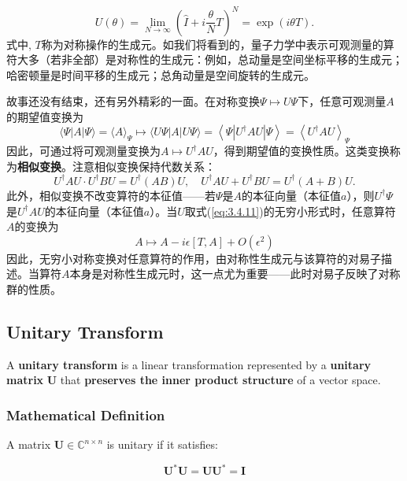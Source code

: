 \begin{equation}
	U(\theta)=\lim_{N\to\infty}\left(\hat I+i\frac{\theta }{N}T\right)^N=\exp(i\theta T).\label{eq:3.4.13} 
\end{equation}
式中, $T$称为对称操作的生成元。如我们将看到的，量子力学中表示可观测量的算符大多（若非全部）是对称性的生成元：例如，总动量是空间坐标平移的生成元；哈密顿量是时间平移的生成元；总角动量是空间旋转的生成元。 \par
故事还没有结束，还有另外精彩的一面。在对称变换$\Psi\mapsto U\Psi$下，任意可观测量$A$的期望值变换为
\begin{equation}
	\langle\Psi|A|\Psi\rangle=\langle A\rangle_{\Psi}\mapsto\langle U\Psi|A| U\Psi\rangle=\left\langle\Psi\left|U^{\dagger} AU\right|\Psi\right\rangle=\left\langle U^{\dagger} AU\right\rangle_{\Psi}
\end{equation}
因此，可通过将可观测量变换为$A\mapsto U^\dagger A U$，得到期望值的变换性质。这类变换称为\textbf{相似变换}。注意相似变换保持代数关系：
\begin{equation}
	U^\dagger AU \cdot U^\dagger BU=U^\dagger(AB)U, \quad U^\dagger AU+U^\dagger BU=U^\dagger(A+B)U.
\end{equation}
此外，相似变换不改变算符的本征值——若$\Psi$是$A$的本征向量（本征值$a$），则$U^\dagger\Psi$是$U^\dagger AU$的本征向量（本征值$a$）。当$U$取式(\ref{eq:3.4.11})的无穷小形式时，任意算符$A$的变换为
\begin{equation}
	A\mapsto A-i\epsilon[T, A]+O(\epsilon^2)
\end{equation}
因此，无穷小对称变换对任意算符的作用，由对称性生成元与该算符的对易子描述。当算符$A$本身是对称性生成元时，这一点尤为重要——此时对易子反映了对称群的性质。
\subsection{Unitary Transform}

A \textbf{unitary transform} is a linear transformation represented by a \textbf{unitary matrix} $\mathbf{U}$ that \textbf{preserves the inner product structure} of a vector space.

\subsubsection*{Mathematical Definition}

A matrix $\mathbf{U} \in \mathbb{C}^{n \times n}$ is unitary if it satisfies:

\[
\mathbf{U}^* \mathbf{U} = \mathbf{U} \mathbf{U}^* = \mathbf{I}
\]

